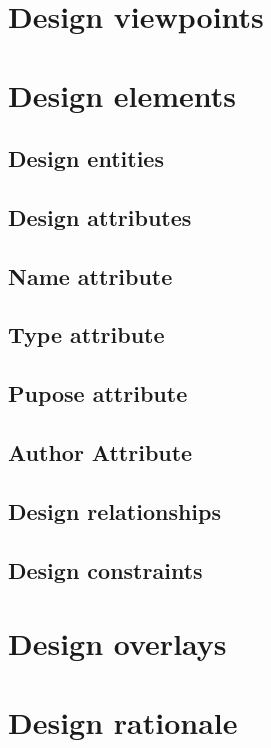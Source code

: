 \documentclass{scrreprt}
\begin{document}
\section{Design viewpoints}

\section{Design elements}

\subsection{Design entities}

\subsection{Design attributes}

\subsection{Name attribute}

\subsection{Type attribute}

\subsection{Pupose attribute}

\subsection{Author Attribute}

\subsection{Design relationships}

\subsection{Design constraints}

\section{Design overlays}

\section{Design rationale}
\end{document}
